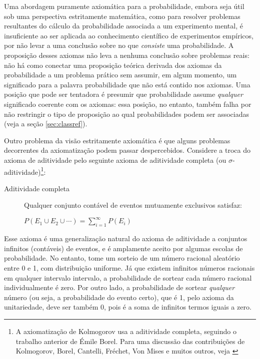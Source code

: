 Uma abordagem puramente axiomática para a probabilidade, embora seja útil sob uma perspectiva estritamente matemática, como
para resolver problemas resultantes do cálculo da probabilidade associada a um experimento mental, 
é insuficiente ao ser aplicada ao conhecimento científico de experimentos empíricos, por não
levar a uma conclusão sobre no que {\em consiste} uma probabilidade. A proposição desses axiomas não leva a nenhuma conclusão 
sobre problemas reais: não há como conectar uma proposição teórica derivada dos axiomas da probabilidade a um problema
prático sem assumir, em algum momento, um significado para a palavra probabilidade que não está contido nos axiomas. Uma posição
que pode ser tentadora é presumir que probabilidade assume {\em qualquer} significado coerente com os axiomas: essa posição,
no entanto, também falha por não restringir o tipo de proposição ao qual probabilidades podem ser associadas (veja a seção
\ref{sec:classref}). 

Outro problema da visão estritamente axiomática é que alguns problemas decorrentes da axiomatização podem passar despercebidos. 
Considere a troca do axioma
de aditividade pelo seguinte axioma de aditividade completa (ou $\sigma$-aditividade)\footnote{A 
axiomatização de Kolmogorov usa a aditividade completa, seguindo o trabalho anterior de Émile Borel.
Para uma discussão das contribuições de Kolmogorov, Borel, Cantelli, Fréchet, Von Mises e muitos outros, 
veja \citep{Shafer03}}:

\begin{description}
	\item[Aditividade completa] Qualquer conjunto contável de eventos mutuamente exclusivos satisfaz:

		$P(E_1 \cup E_2 \cup \cdots) = \sum_{i=1}^\infty P(E_i)$
\end{description}

Esse axioma é uma generalização natural do axioma de aditividade a conjuntos infinitos (contáveis) de eventos, e é amplamente
aceito por algumas escolas de probabilidade. No entanto, tome um sorteio de um número racional aleatório entre 0 e 1, com distribuição uniforme. 
Já que existem infinitos números racionais em qualquer intervalo intervalo,
a probabilidade de sortear cada número racional individualmente é zero. Por outro lado, a probabilidade 
de sortear {\em qualquer} número (ou seja, a probabilidade do evento certo), que é 1, 
pelo axioma da unitariedade, deve ser também 0, pois é a soma de infinitos termos iguais a zero.

